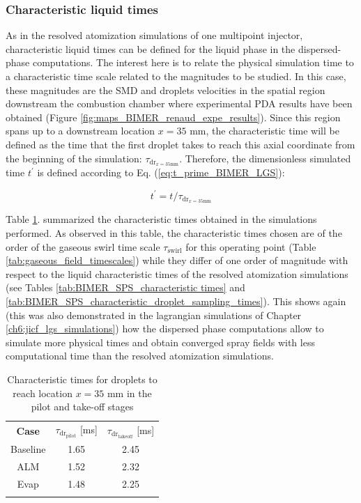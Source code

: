 \subsubsection*{Characteristic liquid times}

As in the resolved atomization simulations of one multipoint injector, characteristic liquid times can be defined for the liquid phase in the dispersed-phase computations. The interest here is to relate the physical simulation time to a characteristic time scale related to the magnitudes to be studied. In this case, these magnitudes are the SMD and droplets velocities in the spatial region downstream the combustion chamber where experimental PDA results have been obtained (Figure \ref{fig:maps_BIMER_renaud_expe_results}). Since this region spans up to a downstream location $x = 35$ mm, the characteristic time will be defined as the time that the first droplet takes to reach this axial coordinate from the beginning of the simulation: $\tau_{\mathrm{dr}_{x=35\mathrm{mm}}}$. Therefore, the dimensionless simulated time $t^{\prime}$ is defined according to Eq. (\ref{eq:t_prime_BIMER_LGS}):

\begin{equation}
\label{eq:t_prime_BIMER_LGS}
t^{\prime} = t / \tau_{\mathrm{dr}_{x=35\mathrm{mm}}}
\end{equation}


Table \ref{tab:BIMER_dispersed_phase_characteristic_times}.  summarized the characteristic times obtained in the simulations performed. As observed in this table, the characteristic times chosen are of the order of the gaseous swirl time scale $\tau_\mathrm{swirl}$ for this operating point (Table \ref{tab:gaseous_field_timescales}) while they differ of one order of magnitude with respect to the liquid characteristic times of the resolved atomization simulations (see Tables \ref{tab:BIMER_SPS_characteristic times} and \ref{tab:BIMER_SPS_characteristic_droplet_sampling_times}).  This shows again (this was also demonstrated in the lagrangian simulations of Chapter \ref{ch6:jicf_lgs_simulations}) how the dispersed phase computations allow to simulate more physical times and obtain converged spray fields with less computational time than the resolved atomization simulations. 


\begin{table}[!h]
\centering
\caption{Characteristic times for droplets to reach location $x = 35$ mm in the pilot and take-off stages }
\begin{tabular}{ccc}
\thickhline
\textbf{Case} & $\tau_{\mathrm{dr}_\mathrm{pilot}}$ [ms] & $\tau_{\mathrm{dr}_\mathrm{takeoff}}$ [ms] \\
\thickhline
Baseline & 1.65 & 2.45 \\  %
ALM & 1.52 & 2.32 \\ %
Evap & 1.48 & 2.25 \\ %
\thickhline
\end{tabular}
\label{tab:BIMER_dispersed_phase_characteristic_times}
\end{table}





